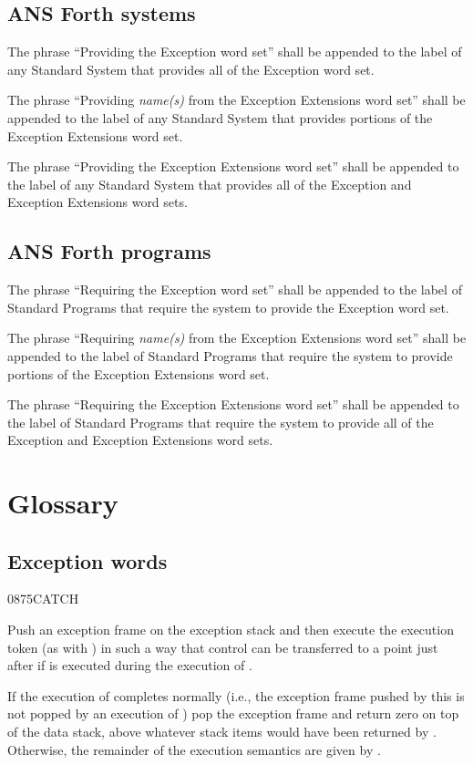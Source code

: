 \subsection{ANS Forth systems} %

The phrase ``Providing the Exception word set'' shall be appended to
the label of any Standard System that provides all of the Exception
word set.

The phrase ``Providing \emph{name(s)} from the Exception Extensions
word set'' shall be appended to the label of any Standard System
that provides portions of the Exception Extensions word set.

The phrase ``Providing the Exception Extensions word set'' shall be
appended to the label of any Standard System that provides all of
the Exception and Exception Extensions word sets.

\subsection{ANS Forth programs} %

The phrase ``Requiring the Exception word set'' shall be appended
to the label of Standard Programs that require the system to provide
the Exception word set.

The phrase ``Requiring \emph{name(s)} from the Exception Extensions
word set'' shall be appended to the label of Standard Programs that
require the system to provide portions of the Exception Extensions
word set.

The phrase ``Requiring the Exception Extensions word set'' shall be
appended to the label of Standard Programs that require the system
to provide all of the Exception and Exception Extensions word sets.

\section{Glossary} %

\subsection{Exception words} %

\begin{worddef}{0875}{CATCH}
\item {}

	Push an exception frame on the exception stack and then execute
	the execution token  (as with ) in
	such a way that control can be transferred to a point just after
	 if  is executed during the execution of
	.

	If the execution of  completes normally (i.e., the
	exception frame pushed by this  is not popped by an
	execution of ) pop the exception frame and return
	zero on top of the data stack, above whatever stack items would
	have been returned by  . Otherwise,
	the remainder of the execution semantics are given by
	.
\end{worddef}


